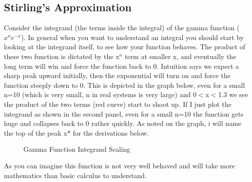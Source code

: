 \documentclass{article}
\begin{document}
\subsection*{Stirling's Approximation}
Consider the integrand (the terms inside the integral) of the gamma function ($x^{n}e^{-x}$). 
In general when you want to understand an integral you should start by looking at the integrand itself, to see how your function behaves. 
The product of these two function is dictated by the x$^n$ term at smaller x, and eventually the long term will win and force the function back to 0.
Intuition says we expect a sharp peak upward initially, then the exponential will turn on and force the function steeply down to 0.
This is depicted in the graph below, even for a small n=10 (which is very small, n in real systems is very large) and 0$<$x$<$1.3 we see the product of the two terms (red curve) start to shoot up. 
If I just plot the integrand as shown in the second panel, even for a small n=10 the function gets huge and collapses back to 0 rather quickly. 
As noted on the graph, i will name the top of the peak x* for the derivations below. 
\begin{figure}[h!]
\caption{Gamma Function Integrand Scaling}
\end{figure}
As you can imagine this function is not very well behaved and will take more mathematics than basic calculus to understand.
\end{document}
